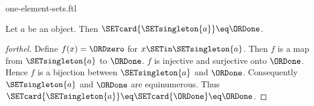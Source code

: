 \documentclass{naproche-library}
\begin{document}
\begin{smodule}[title=$1$-Element Sets]{one-element-sets.ftl}

\begin{proposition}[forthel,id=SET_THEORY_07_836893598023680]
  Let $a$ be an object.
  Then $\SETcard{\SETsingleton{a}} \eq \ORDone$.
\end{proposition}
\begin{proof}[forthel]
  Define $f(x) = \ORDzero$ for $x \SETin \SETsingleton{a}$.
  Then $f$ is a map from $\SETsingleton{a}$ to $\ORDone$.
  $f$ is injective and surjective onto $\ORDone$.
  Hence $f$ is a bijection between $\SETsingleton{a}$ and $\ORDone$.
  Consequently $\SETsingleton{a}$ and $\ORDone$ are equinumerous.
  Thus $\SETcard{\SETsingleton{a}} \eq \SETcard{\ORDone} \eq \ORDone$.
\end{proof}
\end{smodule}
\end{document}
